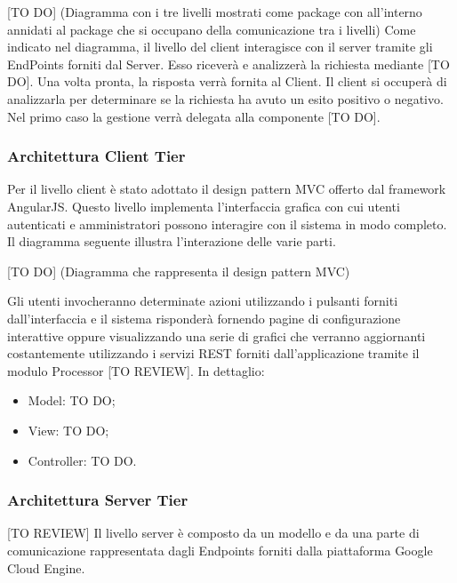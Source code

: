 		[TO DO] (Diagramma con i tre livelli mostrati come package con all'interno annidati al package che si occupano della comunicazione tra i livelli) \newline \newline
		Come indicato nel diagramma, il livello del client interagisce con il server tramite gli EndPoints forniti dal Server. Esso riceverà e analizzerà la richiesta mediante [TO DO]. Una volta pronta, la risposta verrà fornita al Client.\newline
		Il client si occuperà di analizzarla per determinare se la richiesta ha avuto un esito positivo o negativo. Nel primo caso la gestione verrà delegata alla componente [TO DO]. \newline



		\subsubsection{Architettura Client Tier}
		Per il livello client è stato adottato il design pattern MVC offerto dal framework AngularJS. Questo livello implementa l'interfaccia grafica con cui utenti autenticati e amministratori possono interagire con il sistema in modo completo. Il diagramma seguente illustra l'interazione delle varie parti. \newline \newline

		[TO DO] (Diagramma che rappresenta il design pattern MVC) \newline \newline

		Gli utenti invocheranno determinate azioni utilizzando i pulsanti forniti dall'interfaccia e il sistema risponderà fornendo pagine di configurazione interattive oppure visualizzando una serie di grafici che verranno aggiornanti costantemente utilizzando i servizi REST forniti dall'applicazione tramite il modulo Processor [TO REVIEW]. In dettaglio:

		\begin{itemize}
			\item Model: TO DO;
			\item View: TO DO;
			\item Controller: TO DO.
		\end{itemize}

		\subsubsection{Architettura Server Tier}
		[TO REVIEW] Il livello server è composto da un modello e da una parte di comunicazione rappresentata dagli Endpoints forniti dalla piattaforma Google Cloud Engine. \newline \newline

